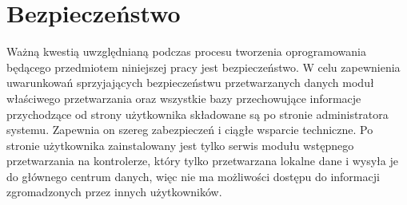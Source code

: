 \documentclass[a4paper]{book}
\begin{document}
\section{Bezpieczeństwo}
Ważną kwestią uwzględnianą podczas procesu tworzenia oprogramowania będącego przedmiotem niniejszej pracy jest bezpieczeństwo. W celu zapewnienia uwarunkowań sprzyjających bezpieczeństwu przetwarzanych danych moduł właściwego przetwarzania oraz wszystkie bazy przechowujące informacje przychodzące od strony użytkownika składowane są po stronie administratora systemu. Zapewnia on szereg zabezpieczeń i ciągłe wsparcie techniczne. Po stronie użytkownika zainstalowany jest tylko serwis modułu wstępnego przetwarzania na kontrolerze, który tylko przetwarzana lokalne dane i wysyła je do głównego centrum danych, więc nie ma możliwości dostępu do informacji zgromadzonych przez innych użytkowników.
\end{document}
